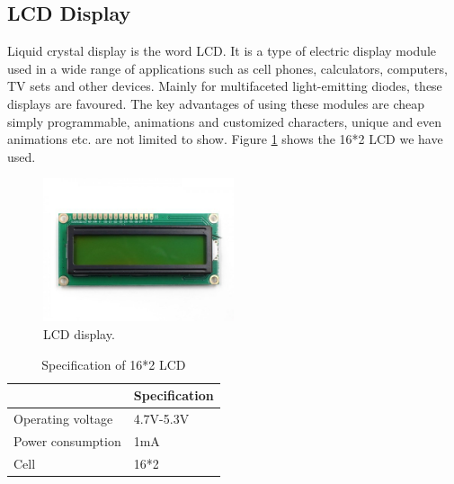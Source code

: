 \subsection{LCD Display}
Liquid crystal display is the word LCD. It is a type of electric display module used in a wide range of applications such as cell phones, calculators, computers, TV sets and other devices. Mainly for multifaceted light-emitting diodes, these displays are favoured. The key advantages of using these modules are cheap simply programmable, animations and customized characters, unique and even animations etc. are not limited to show. Figure \ref{LCD1} shows the 16*2 LCD we have used.
\begin{figure}[h]
\centering
\includegraphics[width=0.5\textwidth]{figures/lcd display.jpg}
\caption{LCD display.}
\label{LCD1}
\end{figure}


\begin{table}[h]
\centering
\caption{Specification of 16*2 LCD}
\begin{tabular}{|l|l|}
\hline
\multicolumn{1}{|c|}{\cellcolor[HTML]{FFFFFF}{\color[HTML]{333333} \textbf{Characteristics}}} & \textbf{Specification} \\ \hline
Operating voltage                                                                       & 4.7V-5.3V              \\ \hline
Power consumption                                                                       & 1mA                    \\ \hline
Cell                                                                                    & 16*2                   \\ \hline
\end{tabular}
\end{table}
\pagebreak

